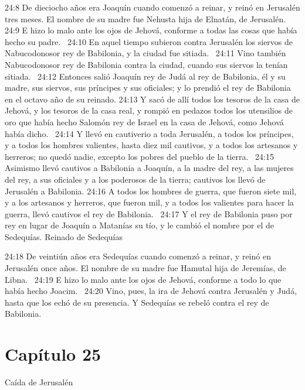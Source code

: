 24:8 De dieciocho años era Joaquín cuando comenzó a reinar, y reinó en Jerusalén tres meses. El nombre de su madre fue Nehusta hija de Elnatán, de Jerusalén.  
24:9 E hizo lo malo ante los ojos de Jehová, conforme a todas las cosas que había hecho su padre.  
24:10 En aquel tiempo subieron contra Jerusalén los siervos de Nabucodonosor rey de Babilonia, y la ciudad fue sitiada.  
24:11 Vino también Nabucodonosor rey de Babilonia contra la ciudad, cuando sus siervos la tenían sitiada.  
24:12 Entonces salió Joaquín rey de Judá al rey de Babilonia, él y su madre, sus siervos, sus príncipes y sus oficiales; y lo prendió el rey de Babilonia en el octavo año de su reinado. 
24:13 Y sacó de allí todos los tesoros de la casa de Jehová, y los tesoros de la casa real, y rompió en pedazos todos los utensilios de oro que había hecho Salomón rey de Israel en la casa de Jehová, como Jehová había dicho.  
24:14 Y llevó en cautiverio a toda Jerusalén, a todos los príncipes, y a todos los hombres valientes, hasta diez mil cautivos, y a todos los artesanos y herreros; no quedó nadie, excepto los pobres del pueblo de la tierra.  
24:15 Asimismo llevó cautivos a Babilonia a Joaquín, a la madre del rey, a las mujeres del rey, a sus oficiales y a los poderosos de la tierra; cautivos los llevó de Jerusalén a Babilonia. 
24:16 A todos los hombres de guerra, que fueron siete mil, y a los artesanos y herreros, que fueron mil, y a todos los valientes para hacer la guerra, llevó cautivos el rey de Babilonia.  
24:17 Y el rey de Babilonia puso por rey en lugar de Joaquín a Matanías su tío, y le cambió el nombre por el de Sedequías. 
Reinado de Sedequías  

24:18 De veintiún años era Sedequías cuando comenzó a reinar, y reinó en Jerusalén once años. El nombre de su madre fue Hamutal hija de Jeremías, de Libna.  
24:19 E hizo lo malo ante los ojos de Jehová, conforme a todo lo que había hecho Joacim.  
24:20 Vino, pues, la ira de Jehová contra Jerusalén y Judá, hasta que los echó de su presencia. Y Sedequías se rebeló contra el rey de Babilonia. 
\section*{Capítulo 25 }
Caída de Jerusalén   

